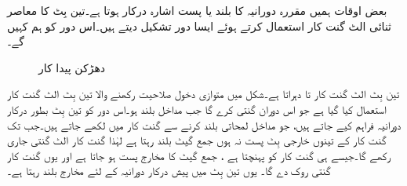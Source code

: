 بعض اوقات ہمیں مقررہ دورانیہ کا بلند یا پست اشارہ درکار ہوتا ہے۔تین بِٹ کا معاصر ثنائی الٹ گنت کار استعمال کرتے ہوئے ایسا دور تشکیل دیتے ہیں۔اس دور کو ہم  کہیں گے۔ 
\begin{figure}
\centering
{}
\caption{دھڑکن پیدا کار}
\label{شکل_گنت_کار_دھڑکن}
\end{figure}

تین بِٹ الٹ گنت کار  تا  دہراتا ہے۔شکل     میں متوازی دخول صلاحیت رکھنے والا تین بِٹ الٹ گنت کار استعمال کیا گیا ہے جو اس دوران گنتی کرے گا جب مداخل  بلند ہو۔اس دور کو تین بِٹ بطور درکار دورانیہ  فراہم کیے جاتے ہیں، جو  مداخل لمحاتی بلند کرنے سے گنت کار میں لکھے جاتے ہیں۔جب تک گنت کار کے تینوں خارجی بِٹ پست نہ ہوں جمع گیٹ بلند رہتا ہے  لہٰذا  گنت کار الٹ گنتی جاری رکھے گا۔جیسے ہی گنت کار  کو پہنچتا ہے ، جمع گیٹ کا مخارج پست ہو جاتا ہے اور یوں گنت کار گنتی روک دے گا۔  یوں تین بِٹ میں پیش درکار  دورانیہ   کے لئے مخارج   بلند رہتا ہے۔

